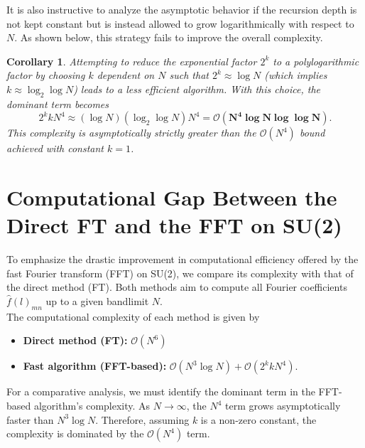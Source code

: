 \documentclass[11pt]{article}
\newtheorem{cor}[thm]{Corollary}
\theoremstyle{definition}
\theoremstyle{remark}
\numberwithin{equation}{section}
\begin{document}
It is also instructive to analyze the asymptotic behavior if the recursion depth is not kept constant but is instead allowed to grow logarithmically with respect to $N$. As shown below, this strategy fails to improve the overall complexity.

\begin{cor}
Attempting to reduce the exponential factor $2^{k}$ to a polylogarithmic factor by choosing $k$ dependent on $N$ such that $2^{k} \approx \log N$ (which implies $k \approx \log_2\log N$) leads to a less efficient algorithm. With this choice, the dominant term becomes
\begin{equation*}
    2^{k} k N^{4} \approx (\log N)(\log_2\log N)N^{4} = \boldsymbol{\mathcal{O}(N^{4}\log N\log\log N)}.
\end{equation*}
This complexity is asymptotically strictly greater than the $\mathcal{O}(N^4)$ bound achieved with constant $k=1$.
\end{cor}









\section{Computational Gap Between the Direct FT and the FFT on SU(2)}\label{sec:ftvsfft}

To emphasize the drastic improvement in computational efficiency offered by the fast Fourier transform (FFT) on SU(2), we compare its complexity with that of the direct method (FT). Both methods aim to compute all Fourier coefficients $\hat{f}(l)_{mn}$ up to a given bandlimit $N$.\\

The computational complexity of each method is given by
\begin{itemize}
    \item \textbf{Direct method (FT):} $\mathcal{O}(N^6)$
    \item \textbf{Fast algorithm (FFT-based):} $\mathcal{O}(N^3 \log N) +\mathcal{O}( 2^k k N^4)$.
\end{itemize}

For a comparative analysis, we must identify the dominant term in the FFT-based algorithm's complexity. As $N \to \infty$, the $N^4$ term grows asymptotically faster than $N^3 \log N$. Therefore, assuming $k$ is a non-zero constant, the complexity is dominated by the $\mathcal{O}(N^4)$ term. 
\end{document}
